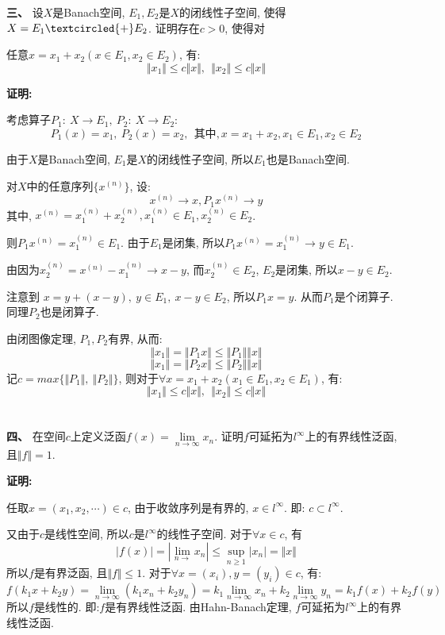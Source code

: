 \documentclass{article}
\begin{document}
\textbf{三、} 设$X$是Banach空间, $E_1, E_2$是$X$的闭线性子空间, 使得$X = E_1 \textcircled{+} E_2$. 证明存在$c > 0$, 使得对

\hspace{2em} 任意$x = x_1 + x_2 (x \in E_1, x_2 \in E_2)$, 有:
$$ \Vert x_1 \Vert \leq c \Vert x \Vert, \ \ \Vert x_2 \Vert \leq c \Vert x \Vert $$ 

\textbf{证明:}

考虑算子$P_1: \ X \longrightarrow E_1, \ P_2: \ X \longrightarrow E_2$:  
$$ P_1(x) = x_1, \ P_2(x)= x_2, \ \  \text{其中}, x = x_1 + x_2, x_1 \in E_1, x_2 \in E_2 $$ 

由于$X$是Banach空间, $E_1$是$X$的闭线性子空间, 所以$E_1$也是Banach空间.

对$X$中的任意序列$\{x^{(n)} \}$, 设:
$$ x^{(n)} \rightarrow x, P_1x^{(n)} \rightarrow y $$ 
其中, $x^{(n)} = x_1^{(n)} + x_2^{(n)}, x_1^{(n)} \in E_1,x_2^{(n)} \in E_2 $.

则$P_1x^{(n)} = x_1^{(n)} \in E_1$. 由于$E_1$是闭集, 所以$P_1x^{(n)} = x_1^{(n)} \rightarrow y \in E_1$.

由因为$x_2^{(n)} = x^{(n)} - x_1^{(n)} \rightarrow x -y$, 而$x_2^{(n)} \in E_2$, $E_2$是闭集, 所以$x-y \in E_2$. 

注意到 $x = y + (x-y), \ y \in E_1, \ x-y \in E_2$, 所以$P_1x = y$. 从而$P_1$是个闭算子. 同理$P_2$也是闭算子.

由闭图像定理, $P_1, P_2$有界, 从而:
$$ \Vert x_1 \Vert = \Vert P_1x \Vert \leq \Vert P_1 \Vert \Vert x \Vert $$
$$ \Vert x_1 \Vert = \Vert P_2x \Vert \leq \Vert P_2 \Vert \Vert x \Vert $$
记$ c = max \{ \Vert P_1 \Vert, \ \Vert P_2 \Vert \}$, 则对于$\forall x = x_1 + x_2 (x_1 \in E_1, x_2 \in E_1)$, 有:
$$ \Vert x_1 \Vert \leq c \Vert x \Vert, \ \ \Vert x_2 \Vert \leq c \Vert x \Vert $$\\  \\


\textbf{四、} 在空间$c$上定义泛函$f(x) = \lim\limits_{n \rightarrow \infty} x_n$. 证明$f$可延拓为$l^{\infty}$上的有界线性泛函, 且$\Vert f \Vert =1$. 

\textbf{证明:}

任取$x = (x_1, x_2, \cdots) \in c$, 由于收敛序列是有界的, $x \in l^{\infty}$. 即: $c \subset l^{\infty}$.

又由于$c$是线性空间, 所以$c$是$l^{\infty}$的线性子空间.  对于$\forall x \in c$, 有
$$ |f(x)| = |\lim\limits_{n \rightarrow} x_n|  \leq \sup\limits_{n \geq 1} |x_n| = \Vert x \Vert $$
所以$f$是有界泛函, 且$\Vert f \Vert \leq 1$. 对于$\forall x=(x_i), y=(y_i) \in c$, 有:
$$ f(k_1x + k_2y) = \lim\limits_{n \rightarrow \infty} (k_1x_n + k_2y_n) = k_1\lim\limits_{n \rightarrow \infty} x_n + k_2\lim\limits_{n \rightarrow \infty} y_n = k_1f(x) + k_2f(y) $$
所以$f$是线性的. 即:$f$是有界线性泛函. 由Hahn-Banach定理, $f$可延拓为$l^{\infty}$上的有界线性泛函.
\end{document}
